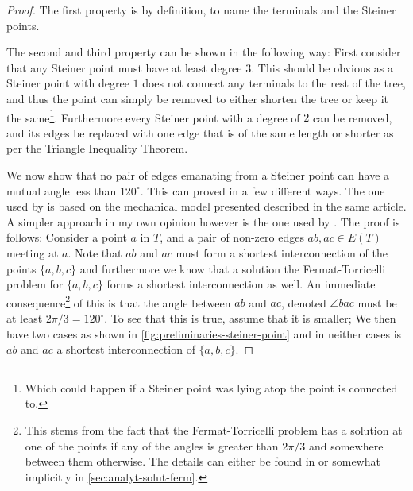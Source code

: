 \begin{proof}
The first property is by definition, to name the terminals and the
Steiner points.

The second and third property can be shown in the following way: First consider that
any Steiner point must have at least degree $3$. This should be obvious as a
Steiner point with degree $1$ does not connect any terminals to the rest of the
tree, and thus the point can simply be removed to either shorten the tree or
keep it the same\footnote{Which could happen if a Steiner point was lying atop
  the point is connected to.}. Furthermore every Steiner point with a degree
of $2$ can be removed, and its edges be replaced with one edge that is of the
same length or shorter as per the Triangle Inequality
Theorem\cite{triangleinequality}.

We now show that no pair of edges emanating from a Steiner point can have a
mutual angle less than $120^{\circ}$. This can proved in a few different
ways. The one used by \textcite{gilbert1968} is based on the mechanical model
presented described in the same article. A simpler approach in my own opinion
however is the one used by \textcite{brazil2015}. The proof is follows: Consider
a point $a$ in $T$, and a pair of non-zero edges $ab, ac \in E(T)$ meeting at
$a$. Note that $ab$ and $ac$ must form a shortest interconnection of the points
$\{a, b, c\}$ and furthermore we know that a solution the Fermat-Torricelli
problem for $\{ a, b, c \}$ forms a shortest interconnection as well. An
immediate consequence\footnote{This stems from the fact that the
  Fermat-Torricelli problem has a solution at one of the points if any of the
  angles is greater than $2 \pi / 3$ and somewhere between them otherwise. The
  details can either be found in \textcite[ch.~1]{brazil2015} or somewhat
  implicitly in \cref{sec:analyt-solut-ferm}.} of this is that the angle between
$ab$ and $ac$, denoted $\angle bac$ must be at least $2 \pi / 3 = 120^{\circ}$.
To see that this is true, assume that it is smaller; We then have two cases as
shown in \cref{fig:preliminaries-steiner-point} and in neither cases is $ab$ and
$ac$ a shortest interconnection of $\{a, b, c\}$.
%
\end{proof}
